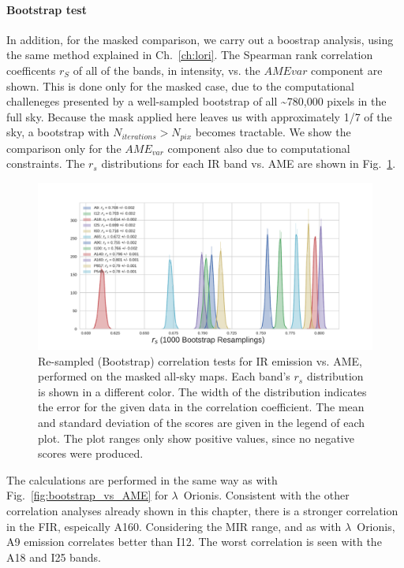           \paragraph{Bootstrap test}
              In addition, for the masked comparison, we carry out a boostrap analysis, using the same method explained in Ch.~\ref{ch:lori}. The Spearman rank correlation coefficents $r_{S}$ of all of the bands, in intensity, vs. the $AME{var}$ component are shown. This is done only for the masked case, due to the computational challeneges presented by a well-sampled bootstrap of all \textasciitilde{}780,000 pixels in the full sky. Because the mask applied here leaves us with approximately 1/7 of the sky, a bootstrap with $N_{iterations} > N_{pix}$ becomes tractable. We show the comparison only for the $AME_{var}$ component also due to computational constraints. The $r_{s}$ distributions for each IR band vs. AME are shown in Fig.~\ref{fig:bootstrap_vs_AME_allsky_masked}.
                \begin{figure}
                     \includegraphics[width=\textwidth]{../Plots/ch_allsky/bootstrap_vs_AME_spearman_maskall_i1000.pdf}
                     \centering
                     \caption{Re-sampled (Bootstrap) correlation tests for IR emission vs. AME, performed on the masked all-sky maps. Each band's $r_{s}$ distribution is shown in a different color. The width of the distribution indicates the error for the given data in the correlation coefficient. The mean and standard deviation of the scores are given in the legend of each plot. The plot ranges only show positive values, since no negative scores were produced. }
                     \label{fig:bootstrap_vs_AME_allsky_masked}
                \end{figure}
            The calculations are performed in the same way as with Fig.~\ref{fig:bootstrap_vs_AME} for $\lambda$~Orionis. Consistent with the other correlation analyses already shown in this chapter, there is a stronger correlation in the FIR, espeically A160. Considering the MIR range, and as with $\lambda$~Orionis, A9 emission correlates better than I12. The worst correlation is seen with the A18 and I25 bands.
